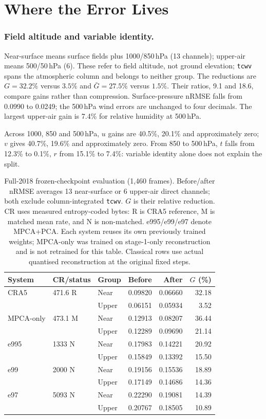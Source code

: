 \section{Where the Error Lives}
\label{sec:where}

\subsubsection{Field altitude and variable identity.}
Near-surface means surface fields plus 1000/850\,hPa (13 channels); upper-air
means 500/50\,hPa (6). These refer to field altitude, not ground elevation;
\texttt{tcwv} spans the atmospheric column and belongs to neither group.
The reductions are $G=32.2\%$ versus $3.5\%$ and $\bar G=27.5\%$ versus
$1.5\%$. Their ratios, 9.1 and 18.6, compare gains rather than compression.
Surface-pressure nRMSE falls from 0.0990 to 0.0249; the 500\,hPa wind errors
are unchanged to four decimals. The largest upper-air gain is 7.4\% for relative
humidity at 500\,hPa.

Across 1000, 850 and 500\,hPa, $u$ gains are 40.5\%, 20.1\% and approximately
zero; $v$ gives 40.7\%, 19.6\% and approximately zero. From 850 to 500\,hPa,
$t$ falls from 12.3\% to 0.1\%, $r$ from 15.1\% to 7.4\%: variable identity alone
does not explain the split.
\begin{table}[t]
\centering
\caption{Full-2018 frozen-checkpoint evaluation (1{,}460 frames). Before/after
nRMSE averages 13 near-surface or 6 upper-air direct channels; both exclude
column-integrated \texttt{tcwv}. $G$ is their relative reduction. CR uses measured entropy-coded bytes: R is CRA5 reference,
M is matched mean rate, and N is non-matched. e995/e99/e97 denote MPCA+PCA.
Each system reuses its own previously trained weights; MPCA-only was trained on
stage-1-only reconstruction and is not retrained for this table. Classical rows
use actual quantised reconstruction at the original fixed steps.}
\label{tab:asymmetry}
\begin{tabular}{lllrr@{\hspace{2em}}r}
\toprule
System & CR/status & Group & Before & After & $G$ (\%) \\
\midrule
CRA5 & 471.6 R & Near & 0.09820 & 0.06660 & 32.18 \\
 & & Upper & 0.06151 & 0.05934 & 3.52 \\
MPCA-only & 473.1 M & Near & 0.12913 & 0.08207 & 36.44 \\
 & & Upper & 0.12289 & 0.09690 & 21.14 \\
e995 & 1333 N & Near & 0.17983 & 0.14221 & 20.92 \\
 & & Upper & 0.15849 & 0.13392 & 15.50 \\
e99 & 2000 N & Near & 0.19156 & 0.15536 & 18.89 \\
 & & Upper & 0.17149 & 0.14686 & 14.36 \\
e97 & 5093 N & Near & 0.22290 & 0.19081 & 14.39 \\
 & & Upper & 0.20767 & 0.18505 & 10.89 \\
\bottomrule
\end{tabular}
\end{table}

